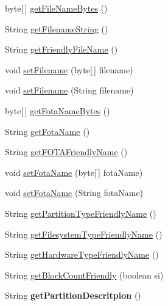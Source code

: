 \begin{DoxyCompactItemize}
\item 
byte\mbox{[}$\,$\mbox{]} \hyperlink{classCASUAL_1_1archiving_1_1libpit_1_1PitEntry_ae4ba59c5a04f97e8e01e8fc6fd021b3c}{get\-File\-Name\-Bytes} ()
\item 
String \hyperlink{classCASUAL_1_1archiving_1_1libpit_1_1PitEntry_a2bb32a410751336bded2da8c98bcf439}{get\-Filename\-String} ()
\item 
String \hyperlink{classCASUAL_1_1archiving_1_1libpit_1_1PitEntry_aa5a661ba922a600a35c1037cc96cf460}{get\-Friendly\-File\-Name} ()
\item 
void \hyperlink{classCASUAL_1_1archiving_1_1libpit_1_1PitEntry_a020e3354fd26273533473c2bc391e846}{set\-Filename} (byte\mbox{[}$\,$\mbox{]} filename)
\item 
void \hyperlink{classCASUAL_1_1archiving_1_1libpit_1_1PitEntry_a816462a2e0544f057a118ffc4ec9f80d}{set\-Filename} (String filename)
\item 
byte\mbox{[}$\,$\mbox{]} \hyperlink{classCASUAL_1_1archiving_1_1libpit_1_1PitEntry_acd4c00ebcc7dec9ab0564563f9cdbede}{get\-Fota\-Name\-Bytes} ()
\item 
String \hyperlink{classCASUAL_1_1archiving_1_1libpit_1_1PitEntry_abd622d9204bd1e46db2b205b016a2726}{get\-Fota\-Name} ()
\item 
String \hyperlink{classCASUAL_1_1archiving_1_1libpit_1_1PitEntry_ad5fe07455a5e697fb7a22eb4de662c11}{get\-F\-O\-T\-A\-Friendly\-Name} ()
\item 
void \hyperlink{classCASUAL_1_1archiving_1_1libpit_1_1PitEntry_a0fc527ed85e5240bc005c91216ea39bb}{set\-Fota\-Name} (byte\mbox{[}$\,$\mbox{]} fota\-Name)
\item 
void \hyperlink{classCASUAL_1_1archiving_1_1libpit_1_1PitEntry_a2ccf03dfe67e6534bf8ffa80799aa55e}{set\-Fota\-Name} (String fota\-Name)
\item 
String \hyperlink{classCASUAL_1_1archiving_1_1libpit_1_1PitEntry_ab5b074367aa08d5f550112c9391dd83e}{get\-Partition\-Type\-Friendly\-Name} ()
\item 
String \hyperlink{classCASUAL_1_1archiving_1_1libpit_1_1PitEntry_adb21af84eb8c643ff7fdef92c9d95c12}{get\-Filesystem\-Type\-Friendly\-Name} ()
\item 
String \hyperlink{classCASUAL_1_1archiving_1_1libpit_1_1PitEntry_a7f07d99691c38de528c66e64350f3701}{get\-Hardware\-Type\-Friendly\-Name} ()
\item 
String \hyperlink{classCASUAL_1_1archiving_1_1libpit_1_1PitEntry_a67803574102dff7d60a87cb785eb327d}{get\-Block\-Count\-Friendly} (boolean si)
\item 
\hypertarget{classCASUAL_1_1archiving_1_1libpit_1_1PitEntry_a0c1f5626ed15b63632a25b7107790442}{String {\bfseries get\-Partition\-Descritpion} ()}\label{classCASUAL_1_1archiving_1_1libpit_1_1PitEntry_a0c1f5626ed15b63632a25b7107790442}


\end{DoxyCompactItemize}
